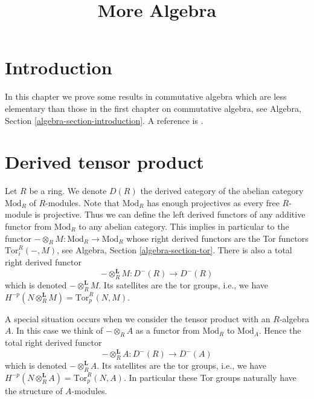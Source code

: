

%


\title{More Algebra}


\maketitle

\label{section-phantom}

\tableofcontents



\section{Introduction}
\label{section-introduction}

\noindent
In this chapter we prove some results in commutative algebra which
are less elementary than those in the first chapter on commutative
algebra, see
Algebra, Section \ref{algebra-section-introduction}.
A reference is \cite{MatCA}.







\section{Derived tensor product}
\label{section-computing-tor}

\noindent
Let $R$ be a ring. We denote $D(R)$ the derived category of the
abelian category $\text{Mod}_R$ of $R$-modules. Note that $\text{Mod}_R$
has enough projectives as every free $R$-module is projective.
Thus we can define the left derived functors of any additive functor
from $\text{Mod}_R$ to any abelian category. This implies in particular
to the functor $- \otimes_R M : \text{Mod}_R \to \text{Mod}_R$
whose right derived functors are the Tor functors $\text{Tor}_i^R(-, M)$, see
Algebra, Section \ref{algebra-section-tor}.
There is also a total right derived functor
\begin{equation}
\label{equation-derived-tensor-module}
-\otimes_R^{\mathbf{L}} M :
D^{-}(R)
\longrightarrow
D^{-}(R)
\end{equation}
which is denoted $-\otimes_R^{\mathbf{L}} M$. Its satellites are the
tor groups, i.e., we have
$H^{-p}(N \otimes_R^{\mathbf{L}} M) = \text{Tor}_p^R(N, M)$.

\medskip\noindent
A special situation occurs when we consider the tensor product with
an $R$-algebra $A$. In this case we think of $- \otimes_R A$
as a functor from $\text{Mod}_R$ to $\text{Mod}_A$. Hence the total
right derived functor
\begin{equation}
\label{equation-derived-tensor-algebra}
-\otimes_R^{\mathbf{L}} A :
D^{-}(R)
\longrightarrow
D^{-}(A)
\end{equation}
which is denoted $-\otimes_R^{\mathbf{L}} A$. Its satellites are the
tor groups, i.e., we have
$H^{-p}(N \otimes_R^{\mathbf{L}} A) = \text{Tor}_p^R(N, A)$.
In particular these Tor groups naturally have the structure of $A$-modules.

